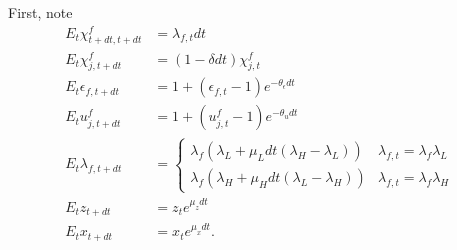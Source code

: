 First, note 
\begin{align*}
    E_t\chi_{t+dt, t+dt}^f &= \lambda_{f, t} dt\\
    E_t\chi_{j, t+dt}^f &= (1 - \delta dt) \chi_{j, t}^f\\
    E_t\epsilon_{f, t+dt} &= 1 + (\epsilon_{f, t} - 1) e^{- \theta_{\epsilon} dt}\\
    E_t u_{j, t+dt}^f &= 1 + (u_{j, t}^f - 1) e^{- \theta_{u} dt} \\
    E_t\lambda_{f, t+dt} &= \begin{cases}
    \lambda_f (\lambda_L + \mu_L dt (\lambda_H - \lambda_L)) & \lambda_{f, t} = \lambda_f \lambda_L \\
    \lambda_f (\lambda_H + \mu_H dt (\lambda_L - \lambda_H))& \lambda_{f, t} = \lambda_f \lambda_H
    \end{cases}  \\
    E_t z_{t+dt} &= z_t e^{\mu_z dt}\\
    E_t x_{t+dt} &= x_t e^{\mu_x dt}.
\end{align*}

